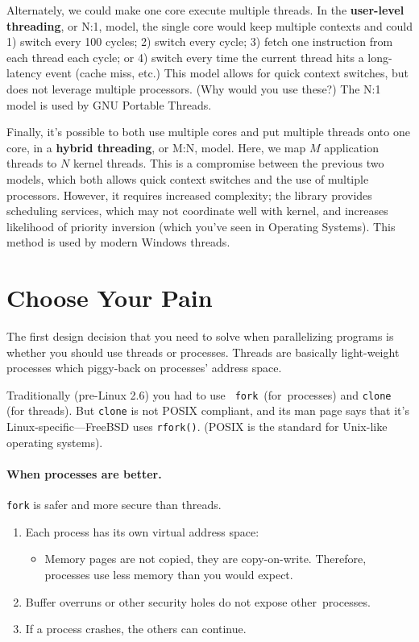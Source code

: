 \documentclass[a4paper]{report}
\begin{document}
Alternately, we could make one core execute multiple threads. In the
{\bf user-level threading}, or N:1, model, the single core would keep
multiple contexts and could 1) switch every 100 cycles; 2) switch
every cycle; 3) fetch one instruction from each thread each cycle; or
4) switch every time the current thread hits a long-latency event
(cache miss, etc.) This model allows for quick context switches, but
does not leverage multiple processors. (Why would you use these?) The N:1 model is used by
GNU Portable Threads.

Finally, it's possible to both use multiple cores and put multiple
threads onto one core, in a {\bf hybrid threading}, or M:N, model. Here, we map $M$ application threads to $N$ kernel threads. This
is a compromise between the previous two models, which both allows
quick context switches and the use of multiple processors. However, it
requires increased complexity; the library provides scheduling
services, which may not coordinate well with kernel, and increases
likelihood of priority inversion (which you've seen in Operating
Systems).  This method is used by modern Windows threads.


\section*{Choose Your Pain}
The first design decision that you need to solve when parallelizing programs
is whether you should use threads or processes. Threads are basically light-weight processes which piggy-back on
          processes' address space.

Traditionally (pre-Linux 2.6) you had to use {\tt
  fork}~(for~processes) and {\tt clone} (for threads). But {\tt clone}
is not POSIX compliant, and its man page says that it's
Linux-specific---FreeBSD uses {\tt rfork()}. (POSIX is the standard
for Unix-like operating systems).

\paragraph{When processes are better.} {\tt fork} is safer and more secure than threads.

  \begin{enumerate}
    \item Each process has its own virtual address space:
      \begin{itemize}
        \item Memory pages are not copied, they are copy-on-write. Therefore, processes use less memory than you would expect.
      \end{itemize}
    \item Buffer overruns or other security holes do not expose other~processes.
    \item If a process crashes, the others can continue.
  \end{enumerate}
\end{document}
